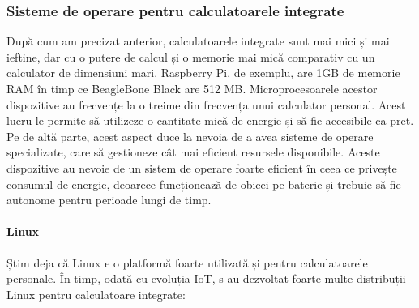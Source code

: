 \subsubsection{Sisteme de operare pentru calculatoarele integrate}
\label{sec:embed:micro-comp:embed:os}

După cum am precizat anterior, calculatoarele integrate sunt mai mici și mai ieftine, dar cu o putere de calcul și o memorie mai mică comparativ cu un calculator de dimensiuni mari.
Raspberry Pi, de exemplu, are 1GB de memorie RAM în timp ce BeagleBone Black are 512 MB.
Microprocesoarele acestor dispozitive au frecvențe la o treime din frecvența unui calculator personal.
Acest lucru le permite să utilizeze o cantitate mică de energie și să fie accesibile ca preț.
 Pe de altă parte, acest aspect duce la nevoia de a avea sisteme de operare specializate, care să gestioneze cât mai eficient resursele disponibile.
Aceste dispozitive au nevoie de un sistem de operare foarte eficient în ceea ce privește consumul de energie, deoarece funcționează de obicei pe baterie și trebuie să fie autonome pentru perioade lungi de timp.

\paragraph{Linux}

Știm deja că Linux e o platformă foarte utilizată și pentru calculatoarele personale.
În timp, odată cu evoluția IoT, s-au dezvoltat foarte multe distribuții Linux pentru calculatoare integrate:

